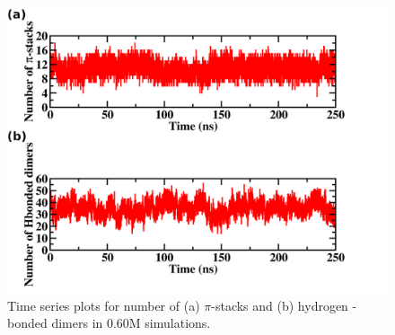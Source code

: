 \begin{figure}
    \centering
    \includegraphics[width=\textwidth]{Chapter2/Figures/B3_port.png}
    \caption[Time series plots for number of $\pi$-stacks and hydrogen - bonded dimers in 0.60M simulations]{Time series plots for number of (a) $\pi$-stacks and (b) hydrogen - bonded dimers in 0.60M simulations.}    
\end{figure}

